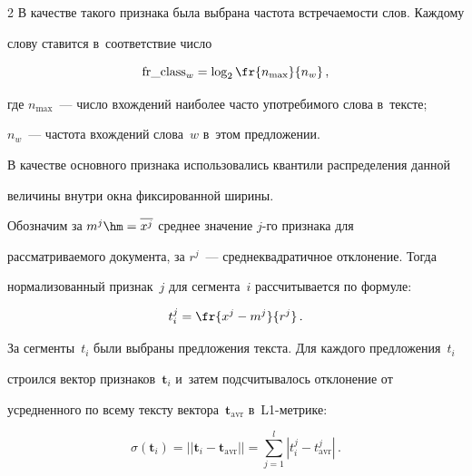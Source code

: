 \begin{multicols}{2}
В качестве такого признака была выбрана час\-то\-та встречаемости слов. Каждому 

слову ставится в~соответствие число



\noindent

\begin{equation}

  \label{1-saf}

  \text{fr\_class}_w = \log_2 \fr{n_{\max}}{n_w}\,,

\end{equation}

где $n_{\max}$~--- число вхождений наиболее часто употребимого слова в~тексте; 

$n_w$~--- частота вхождений слова~$w$ в~этом предложении.



В качестве основного признака использовались квантили распределения данной 

величины внутри окна фиксированной ширины.



Обозначим за $m^j \hm=\overline{x^j}$ среднее значение $j$-го признака для 

рассматриваемого документа, за $r^j$~--- среднеквадратичное отклонение. Тогда 

нормализованный признак~$j$ для сегмента~$i$ рассчитывается по формуле:

$$

t_i^j=\fr{x^j-m^j}{r^j}\,. 

$$



За сегменты~$t_i$ были выбраны предложения текс\-та. Для каждого предложения~$t_i$ 

строился вектор признаков~$\mathbf{t}_i$ и~затем подсчитывалось отклонение от 

усредненного по всему текс\-ту вектора~$\mathbf{t}_{\mathrm{avr}}$ в~L1-мет\-рике:



\vspace*{-2pt}  



  \noindent

\begin{equation}

  \sigma(\mathbf{t}_i)=||\mathbf{t}_i-\mathbf{t}_{\mathrm{avr}}|| = 

\sum\limits_{j=1}^l|t_i^j-t_{\mathrm{avr}}^j|\,.

  \label{2-saf}


\end{equation}
\end{multicols}

